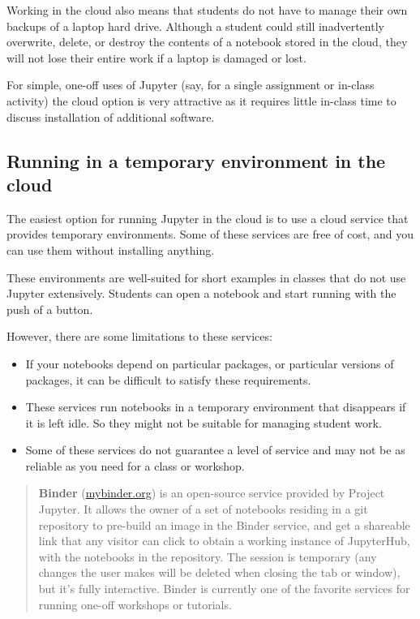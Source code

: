 \documentclass[]{book}
\begin{document}
Working in the cloud also means that students do not have to manage
their own backups of a laptop hard drive. Although a student could still
inadvertently overwrite, delete, or destroy the contents of a notebook
stored in the cloud, they will not lose their entire work if a laptop is
damaged or lost.

For simple, one-off uses of Jupyter (say, for a single assignment or
in-class activity) the cloud option is very attractive as it requires
little in-class time to discuss installation of additional software.

\subsection{Running in a temporary environment in the
cloud}\label{running-in-a-temporary-environment-in-the-cloud}

The easiest option for running Jupyter in the cloud is to use a cloud
service that provides temporary environments. Some of these services are
free of cost, and you can use them without installing anything.

These environments are well-suited for short examples in classes that do
not use Jupyter extensively. Students can open a notebook and start
running with the push of a button.

However, there are some limitations to these services:

\begin{itemize}
\item
  If your notebooks depend on particular packages, or particular
  versions of packages, it can be difficult to satisfy these
  requirements.
\item
  These services run notebooks in a temporary environment that
  disappears if it is left idle. So they might not be suitable for
  managing student work.
\item
  Some of these services do not guarantee a level of service and may not
  be as reliable as you need for a class or workshop.
\end{itemize}

\begin{quote}
\textbf{Binder} (\href{https://mybinder.org}{mybinder.org}) is an
open-source service provided by Project Jupyter. It allows the owner of
a set of notebooks residing in a git repository to pre-build an image in
the Binder service, and get a shareable link that any visitor can click
to obtain a working instance of JupyterHub, with the notebooks in the
repository. The session is temporary (any changes the user makes will be
deleted when closing the tab or window), but it's fully interactive.
Binder is currently one of the favorite services for running one-off
workshops or tutorials.
\end{quote}
\end{document}
